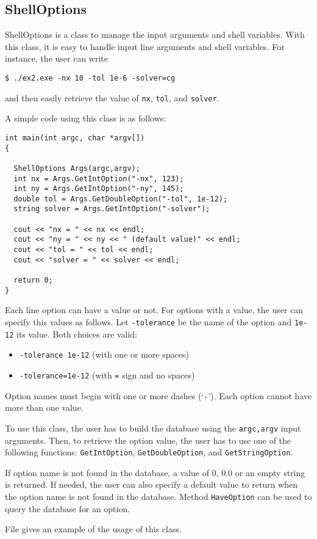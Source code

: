 
\subsection{ShellOptions}
\label{sec:triutils:shell}

ShellOptions is a class to manage the input arguments and shell
variables.  With this class, it is easy to handle input line arguments
and shell variables. For instance, the user can write 
\begin{verbatim}
$ ./ex2.exe -nx 10 -tol 1e-6 -solver=cg 
\end{verbatim}
and then easily retrieve the value of {\tt nx}, {\tt tol}, and {\tt solver}.
 
A simple code using this class is as follows:
\begin{verbatim}
int main(int argc, char *argv[])
{

  ShellOptions Args(argc,argv);
  int nx = Args.GetIntOption("-nx", 123);
  int ny = Args.GetIntOption("-ny", 145);
  double tol = Args.GetDoubleOption("-tol", 1e-12);
  string solver = Args.GetIntOption("-solver");

  cout << "nx = " << nx << endl;
  cout << "ny = " << ny << " (default value)" << endl;
  cout << "tol = " << tol << endl;
  cout << "solver = " << solver << endl;

  return 0;
}
\end{verbatim}

Each line   option can have a value or not. For options with a value,
the user can specify this values as follows. Let \verb!-tolerance! be the
name of the option and \verb!1e-12! its value. Both choices are valid:
\begin{itemize}
\item \verb!-tolerance 1e-12! (with one or more spaces)
\item \verb!-tolerance=1e-12! (with \verb!=! sign and no spaces)
\end{itemize}

Option names must begin with one or more dashes (`\verb!-!'). Each option
cannot have more than one value.

To use this class, the user has to build the database using the 
\verb!argc,argv! input arguments. Then, to retrieve the option value, the user
 has to use one of the following functions:
\verb!GetIntOption!, \verb!GetDoubleOption!, and \verb!GetStringOption!.
 
If option name is not found in the database, a value of 0, 0.0 or an
 empty string is returned. If needed, the user can also specify a
 default value to return when the option name is not found in the
 database. Method \verb!HaveOption! can be used to query the database for
 an option.

File  gives an example of the usage of this class.
 
